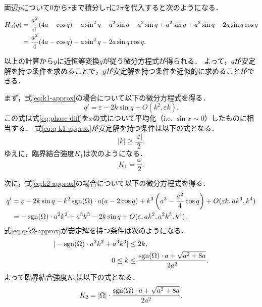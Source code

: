 \documentclass[../main]{subfiles}
\begin{document}
    両辺$p$について$0$から$\tau$まで積分し$\tau$に$2\pi$を代入すると次のようになる．
    \begin{align}
        H_3(q)&=\frac{a^2}{4}(4a-\cos q)-a\sin^2 q-a^2\sin q-a^2\sin q+a^2\sin q+a^2\sin q-2a\sin q\cos q\notag\\
        &=\frac{a^2}{4}(4a-\cos q)-a\sin^2 q-2a\sin q\cos q.
        \label{eq:H3-approx}
    \end{align}

    以上の計算から$y$に近恒等変換$q$が従う微分方程式が得られる．
    よって，$q$が安定解を持つ条件を求めることで，$y$が安定解を持つ条件を近似的に求めることができる．
    
    まず，式\eqref{eq:k1-approx}の場合について以下の微分方程式を得る．
    \begin{equation}
        q'=\varepsilon-2k\sin q+O(k^2,\varepsilon k).
        \label{eq:q-k1-approx}
    \end{equation}
    この式は式\eqref{eq:phase-diff}を$x$の式について平均化（i.e. $\sin x\sim 0$）したものに相当する．
    式\eqref{eq:q-k1-approx}が安定解を持つ条件は以下の式となる．
    \begin{equation}
        |k|\geq\frac{|\varepsilon|}{2}.
    \end{equation}
    ゆえに，臨界結合強度$K_1$は次のようになる．
    \begin{equation}
        \label{eq:K1-approx}
        K_1=\frac{\omega}{2}.
    \end{equation}

    次に，式\eqref{eq:k2-approx}の場合について以下の微分方程式を得る．
    \begin{align}
        \label{eq:q-k2-approx}
        \begin{split}
            q'&=\varepsilon-2k\sin q-k^2\operatorname{sgn}(\Omega)\cdot a(a-2\cos  q)+k^3\left(a^3-\frac{a^2}{4}\cos q\right)+O(\varepsilon k,ak^3,k^4)\\
            &=-\operatorname{sgn}(\Omega)\cdot a^2k^2+a^3k^3-2k\sin q+O(\varepsilon,ak^2,a^2k^3,k^4).
        \end{split}
    \end{align}
    式\eqref{eq:q-k2-approx}が安定解を持つ条件は次のようになる．
    \begin{align}
        |-\operatorname{sgn}(\Omega)\cdot a^2k^2+a^3k^3|&\leq 2k,\notag\\
        0\leq k&\leq \frac{\operatorname{sgn}(\Omega) \cdot a+\sqrt{a^2+8a}}{2a^2}.
    \end{align}
    よって臨界結合強度$K_2$は以下の式となる．
    \begin{equation}
        \label{eq:K2-approx}
        K_2=|\Omega|\cdot\frac{\operatorname{sgn}(\Omega) \cdot a+\sqrt{a^2+8a}}{2a^2}.
    \end{equation}
\end{document}
